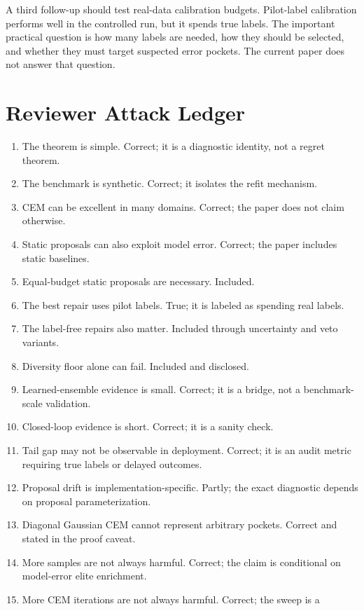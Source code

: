 A third follow-up should test real-data calibration budgets. Pilot-label
calibration performs well in the controlled run, but it spends true labels.
The important practical question is how many labels are needed, how they should
be selected, and whether they must target suspected error pockets. The current
paper does not answer that question.

\section{Reviewer Attack Ledger}
\label{app:reviewer-ledger}

\begin{enumerate}
\item The theorem is simple. Correct; it is a diagnostic identity, not a regret
theorem.
\item The benchmark is synthetic. Correct; it isolates the refit mechanism.
\item CEM can be excellent in many domains. Correct; the paper does not claim
otherwise.
\item Static proposals can also exploit model error. Correct; the paper
includes static baselines.
\item Equal-budget static proposals are necessary. Included.
\item The best repair uses pilot labels. True; it is labeled as spending real
labels.
\item The label-free repairs also matter. Included through uncertainty and
veto variants.
\item Diversity floor alone can fail. Included and disclosed.
\item Learned-ensemble evidence is small. Correct; it is a bridge, not a
benchmark-scale validation.
\item Closed-loop evidence is short. Correct; it is a sanity check.
\item Tail gap may not be observable in deployment. Correct; it is an audit
metric requiring true labels or delayed outcomes.
\item Proposal drift is implementation-specific. Partly; the exact diagnostic
depends on proposal parameterization.
\item Diagonal Gaussian CEM cannot represent arbitrary pockets. Correct and
stated in the proof caveat.
\item More samples are not always harmful. Correct; the claim is conditional on
model-error elite enrichment.
\item More CEM iterations are not always harmful. Correct; the sweep is a

\end{enumerate}
